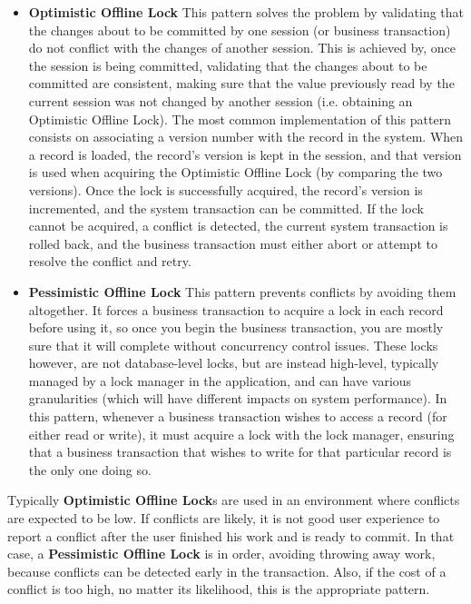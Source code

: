 \begin{itemize}
\item {\bf Optimistic Offline Lock} This pattern solves the problem by
  validating that the changes about to be committed by one session (or
  business transaction) do not conflict with the changes of another
  session. This is achieved by, once the session is being committed,
  validating that the changes about to be committed are consistent,
  making sure that the value previously read by the current session
  was not changed by another session (i.e. obtaining an Optimistic
  Offline Lock).  The most common implementation of this pattern
  consists on associating a version number with the record in the
  system. When a record is loaded, the record's version is kept in the
  session, and that version is used when acquiring the Optimistic
  Offline Lock (by comparing the two versions). Once the lock is
  successfully acquired, the record's version is incremented, and the
  system transaction can be committed. If the lock cannot be acquired,
  a conflict is detected, the current system transaction is rolled
  back, and the business transaction must either abort or attempt to
  resolve the conflict and retry.

\item {\bf Pessimistic Offline Lock} This pattern prevents conflicts
  by avoiding them altogether. It forces a business transaction to
  acquire a lock in each record before using it, so once you begin the
  business transaction, you are mostly sure that it will complete
  without concurrency control issues. These locks however, are not
  database-level locks, but are instead high-level, typically managed
  by a lock manager in the application, and can have various
  granularities (which will have different impacts on system
  performance). In this pattern, whenever a business transaction
  wishes to access a record (for either read or write), it must
  acquire a lock with the lock manager, ensuring that a business
  transaction that wishes to write for that particular record is the
  only one doing so.
\end{itemize}

Typically {\bf Optimistic Offline Lock}s are used in an environment
where conflicts are expected to be low. If conflicts are likely, it is
not good user experience to report a conflict after the user finished
his work and is ready to commit. In that case, a {\bf Pessimistic
  Offline Lock} is in order, avoiding throwing away work, because
conflicts can be detected early in the transaction. Also, if the cost
of a conflict is too high, no matter its likelihood, this is the
appropriate pattern.

